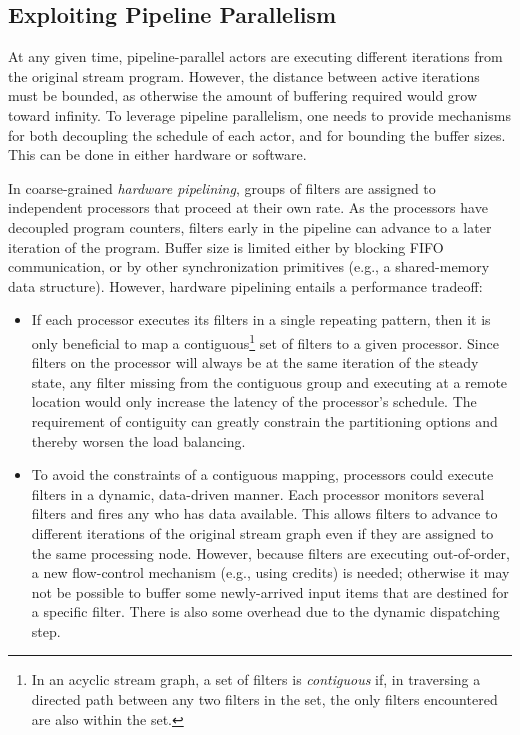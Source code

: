 \subsection{Exploiting Pipeline Parallelism}

At any given time, pipeline-parallel actors are executing different
iterations from the original stream program.  However, the distance
between active iterations must be bounded, as otherwise the amount of
buffering required would grow toward infinity.  To leverage pipeline
parallelism, one needs to provide mechanisms for both decoupling the
schedule of each actor, and for bounding the buffer sizes.  This can
be done in either hardware or software.

In coarse-grained {\it hardware pipelining}, groups of filters are
assigned to independent processors that proceed at their own rate.  As
the processors have decoupled program counters, filters early in the
pipeline can advance to a later iteration of the program.  Buffer size
is limited either by blocking FIFO communication, or by other
synchronization primitives (e.g., a shared-memory data structure).
However, hardware pipelining entails a performance tradeoff:

\begin{itemize}

\item If each processor executes its filters in a single repeating
pattern, then it is only beneficial to map a contiguous\footnote{In an
acyclic stream graph, a set of filters is {\it contiguous} if, in
traversing a directed path between any two filters in the set, the
only filters encountered are also within the set.} set of filters to a
given processor.  Since filters on the processor will always be at the
same iteration of the steady state, any filter missing from the
contiguous group and executing at a remote location would only
increase the latency of the processor's schedule.  The requirement of
contiguity can greatly constrain the partitioning options and thereby
worsen the load balancing.

\item To avoid the constraints of a contiguous mapping, processors
could execute filters in a dynamic, data-driven manner.  Each
processor monitors several filters and fires any who has data
available.  This allows filters to advance to different iterations of
the original stream graph even if they are assigned to the same
processing node.  However, because filters are executing out-of-order,
a new flow-control mechanism (e.g., using credits) is needed;
otherwise it may not be possible to buffer some newly-arrived input
items that are destined for a specific filter.  There is also some
overhead due to the dynamic dispatching step.

\end{itemize}

